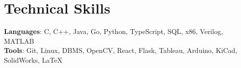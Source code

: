 \documentclass[letterpaper,11pt]{article}
\begin{document}
%
\section{Technical Skills}
 \begin{itemize}[leftmargin=0.15in, label={}]
    \small{\item{
     \textbf{Languages}{: C, C++, Java, Go, Python, TypeScript, SQL, x86, Verilog, MATLAB} \\
     \textbf{Tools}{: Git, Linux, DBMS, OpenCV, React, Flask, Tableau, Arduino, KiCad, SolidWorks, \LaTeX}
    }}
 \end{itemize}


\end{document}
